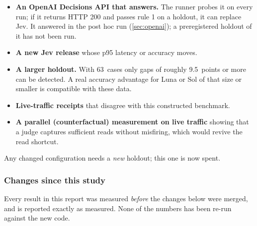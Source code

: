 \documentclass[11pt,letterpaper]{article}
\newcommand{\HoldMinDetectPts}{9.5}
\newcommand{\HoldN}{63}
\begin{document}
\begin{itemize}
  \item \textbf{An OpenAI Decisions API that answers.} The runner probes it on every run; if it returns
    HTTP 200 and passes rule 1 on a holdout, it can replace Jev. It answered in the post hoc run (\cref{sec:openai});
    a preregistered holdout of it has not been run.
  \item \textbf{A new Jev release} whose p95 latency or accuracy moves.
  \item \textbf{A larger holdout.} With \HoldN\ cases only gaps of roughly \HoldMinDetectPts\ points or
    more can be detected. A real accuracy advantage for Luna or Sol of that size or smaller is
    compatible with these data.
  \item \textbf{Live-traffic receipts} that disagree with this constructed benchmark.
  \item \textbf{A parallel (counterfactual) measurement on live traffic} showing that a judge captures
    sufficient reads without misfiring, which would revive the read shortcut.
\end{itemize}
Any changed configuration needs a \emph{new} holdout; this one is now spent.

\subsubsection{Changes since this study}\label{jb:sec:since}

\begin{caution}[title={Measured before these changes}]
Every result in this report was measured \emph{before} the changes below were merged, and is reported
exactly as measured. None of the numbers has been re-run against the new code.
\end{caution}
\end{document}

